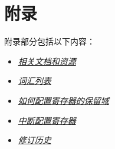 \documentclass[openany, 10pt]{book}
\begin{document}




\part{附录}\label{appendix}

附录部分包括以下内容：

\begin{itemize}
    \item \hyperref[sec:resources]{\textit{相关文档和资源}}
    \item \hyperref[glossary]{\textit{词汇列表}}
    \item \hyperref[programming-reserved-field]{\textit{如何配置寄存器的保留域}}
    \item \hyperref[interrupt-config-registers]{\textit{中断配置寄存器}}
    \item \hyperref[revision-history]{\textit{修订历史}}
\end{itemize}



\clearpage


\clearpage


\clearpage


\clearpage


\clearpage


\clearpage

\end{document}
